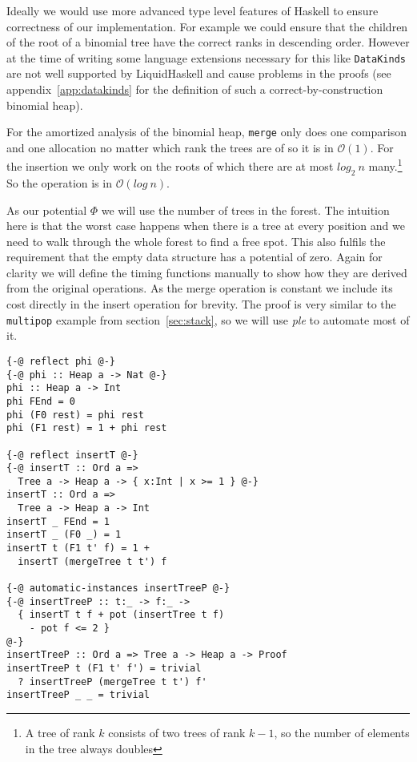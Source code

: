 \documentclass[sigplan,screen,review,anonymous]{acmart}
\renewcommand\O[1]{$\mathcal{O}(#1)$}
\begin{document}
Ideally we would use more advanced type level features of Haskell to ensure correctness of our implementation. For example we could ensure that the children of the root of a binomial tree have the correct ranks in descending order. However at the time of writing some language extensions necessary for this like \texttt{DataKinds} are not well supported by LiquidHaskell and cause problems in the proofs (see appendix~\ref{app:datakinds} for the definition of such a correct-by-construction binomial heap).

For the amortized analysis of the binomial heap, \texttt{merge} only does one comparison and one allocation no matter which rank the trees are of so it is in \O{1}. For the insertion we only work on the roots of which there are at most $log_2 \: n$ many.\footnote{A tree of rank $k$ consists of two trees of rank $k - 1$, so the number of elements in the tree always doubles} So the operation is in \O{log \: n}.

As our potential $\Phi$ we will use the number of trees in the forest. The intuition here is that the worst case happens when there is a tree at every position and we need to walk through the whole forest to find a free spot. This also fulfils the requirement that the empty data structure has a potential of zero. Again for clarity we will define the timing functions manually to show how they are derived from the original operations. As the merge operation is constant we include its cost directly in the insert operation for brevity. The proof is very similar to the \texttt{multipop} example from section~\ref{sec:stack}, so we will use \textit{ple} to automate most of it.

\begin{lstlisting}
{-@ reflect phi @-}
{-@ phi :: Heap a -> Nat @-}
phi :: Heap a -> Int
phi FEnd = 0
phi (F0 rest) = phi rest
phi (F1 rest) = 1 + phi rest

{-@ reflect insertT @-}
{-@ insertT :: Ord a =>
  Tree a -> Heap a -> { x:Int | x >= 1 } @-}
insertT :: Ord a =>
  Tree a -> Heap a -> Int
insertT _ FEnd = 1
insertT _ (F0 _) = 1
insertT t (F1 t' f) = 1 +
  insertT (mergeTree t t') f

{-@ automatic-instances insertTreeP @-}
{-@ insertTreeP :: t:_ -> f:_ ->
  { insertT t f + pot (insertTree t f)
    - pot f <= 2 }
@-}
insertTreeP :: Ord a => Tree a -> Heap a -> Proof
insertTreeP t (F1 t' f') = trivial
  ? insertTreeP (mergeTree t t') f'
insertTreeP _ _ = trivial
\end{lstlisting}
\end{document}
